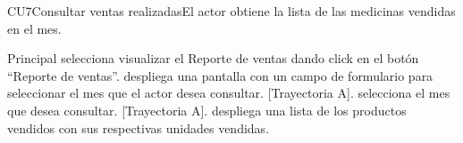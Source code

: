 	\begin{UseCase}{CU7}{Consultar ventas realizadas}{El actor obtiene la lista de las medicinas vendidas en el mes.}
	\end{UseCase}
\begin{UCtrayectoria}{Principal}
	\UCpaso[\UCactor] selecciona visualizar el Reporte de ventas dando click en el botón ``Reporte de ventas''.
	\UCpaso despliega una pantalla con un campo de formulario para seleccionar el mes que el actor desea consultar. [Trayectoria A].
	\UCpaso[\UCactor] selecciona el mes que desea consultar. [Trayectoria A].
	\UCpaso despliega una lista de los productos vendidos con sus respectivas unidades vendidas.
\end{UCtrayectoria}

